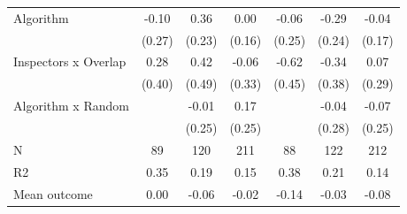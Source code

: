 \begin{tabular}{lccc|ccc}
Algorithm   &       -0.10         &        0.36         &        0.00         &       -0.06         &       -0.29         &       -0.04         \\
            &      (0.27)         &      (0.23)         &      (0.16)         &      (0.25)         &      (0.24)         &      (0.17)         \\
\addlinespace
Inspectors x Overlap&        0.28         &        0.42         &       -0.06         &       -0.62         &       -0.34         &        0.07         \\
            &      (0.40)         &      (0.49)         &      (0.33)         &      (0.45)         &      (0.38)         &      (0.29)         \\
\addlinespace
Algorithm x Random&                     &       -0.01         &        0.17         &                     &       -0.04         &       -0.07         \\
            &                     &      (0.25)         &      (0.25)         &                     &      (0.28)         &      (0.25)         \\
\midrule
N           &          89         &         120         &         211         &          88         &         122         &         212         \\
R2          &        0.35         &        0.19         &        0.15         &        0.38         &        0.21         &        0.14         \\
Mean outcome&        0.00         &       -0.06         &       -0.02         &       -0.14         &       -0.03         &       -0.08         \\
\bottomrule \end{tabular}
